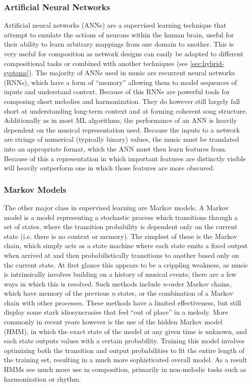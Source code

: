 \documentclass[ author={Stephen Livermore-Tozer},
				supervisor={Dr. Peter Flach},
				degree={MEng},
				title={Algorithmic Co-composition Using Machine Learning},
				subtitle={},
				type={research},
				year={2016} ]{dissertation}
\begin{document}
	\subsubsection{Artificial Neural Networks}
	
	Artificial neural networks (ANNs) are a supervised learning technique that attempt to emulate the actions of neurons within the human brain, useful for their ability to learn arbitrary mappings from one domain to another. This is very useful for composition as network designs can easily be adapted to different compositional tasks or combined with another techniques (see \ref{sec:hybrid-systems}). The majority of ANNs used in music are recurrent neural networks (RNNs), which have a form of ``memory'' allowing them to model sequences of inputs and understand context. Because of this RNNs are powerful tools for composing short melodies and harmonization. They do however still largely fall short at understanding long-term context and at forming coherent song structure. Additionally as in most ML algorithms, the performance of an ANN is heavily dependent on the musical representation used. Because the inputs to a network are strings of numerical (typically binary) values, the music must be translated into an appropriate format, which the ANN must then learn features from. Because of this a representation in which important features are distinctly visible will heavily outperform one in which those features are more obscured.
	
	\subsubsection{Markov Models}
	\label{sec:markov-models}
		
	The other major class in supervised learning are Markov models. A Markov model is a model representing a stochastic process which transitions through a set of states, where the transition probability is dependent only on the current state (i.e. there is no context or memory). The simplest of these is the Markov chain, which simply acts as a state machine where each state emits a fixed output when arrived at and then probabilistically transitions to another based only on the current state. At first glance this appears to be a crippling weakness, as music is intrinsically involves building on a history of musical events; there are a few ways in which this is resolved. Such methods include \textit{n}-order Markov chains, which have memory of the previous \textit{n} states, or the combination of a Markov chain with other processes. These methods have a limited effectiveness, but still display some stark idiosyncrasies that feel ``out of place'' in a melody. More commonly in recent years however is the use of the hidden Markov model (HMM), in which the exact state of the model at any given time is unknown, and each state outputs values with a certain probability. Training this model involves optimizing both the transition and output probabilities to fit the entire length of the training set, resulting in a much more sophisticated overall model. As a result HMMs see much more use in composition, primarily in non-melodic tasks such as harmonization or rhythm.
	
\end{document}
